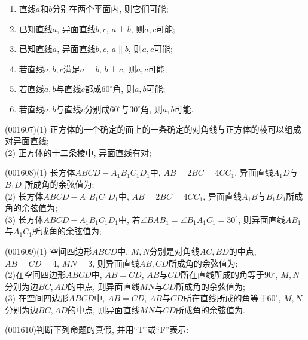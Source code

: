 \begin{enumerate}[(1)]
\item 直线$a$和$b$分别在两个平面内, 则它们可能;\\ 
\item 已知直线$a$, 异面直线$b,c$, $a \perp b$, 则$a,c$可能;\\ 
\item 已知直线$a$, 异面直线$b,c$, $a \parallel b$, 则$a,c$可能;\\ 
\item 若直线$a,b,c$满足$a\perp b$, $b\perp c$, 则$a,c$可能;\\ 
\item 若直线$a,b$与直线$c$都成$60^\circ$角, 则$a,b$可能;\\ 
\item 若直线$a,b$与直线$c$分别成$60^\circ$与$30^\circ$角, 则$a,b$可能.
\end{enumerate}
\item (001607)(1) 正方体的一个确定的面上的一条确定的对角线与正方体的棱可以组成对异面直线;\\ 
(2) 正方体的十二条棱中, 异面直线有对;
\item (001608)(1) 长方体$ABCD-A_1B_1C_1D_1$中, $AB=2BC=4CC_1$, 异面直线$A_1D$与$B_1D_1$所成角的余弦值为;\\ 
(2) 长方体$ABCD-A_1B_1C_1D_1$中, $AB=2BC=4CC_1$, 异面直线$A_1B$与$B_1D_1$所成角的余弦值为;\\ 
(3) 长方体$ABCD-A_1B_1C_1D_1$中, 若$\angle BAB_1=\angle B_1A_1C_1=30^\circ$, 则异面直线$AB_1$与$A_1C_1$所成角的余弦值为;
\item (001609)(1) 空间四边形$ABCD$中, $M,N$分别是对角线$AC,BD$的中点, $AB=CD=4$, $MN=3$, 则异面直线$AB,CD$所成角的余弦值为;\\ 
(2)在空间四边形$ABCD$中, $AB=CD$, $AB$与$CD$所在直线所成的角等于$90^\circ$, $M,N$分别为边$BC,AD$的中点, 则异面直线$MN$与$CD$所成角的余弦值为;\\ 
(3) 在空间四边形$ABCD$中, $AB=CD$, $AB$与$CD$所在直线所成的角等于$60^\circ$, $M,N$分别为边$BC,AD$的中点, 则异面直线$MN$与$CD$所成角的余弦值为.
\item (001610)判断下列命题的真假, 并用``{\rm T}''或``{\rm F}''表示:
